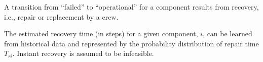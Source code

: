 \documentclass[runningheads]{llncs}
\begin{document}
A transition from  ``failed'' to  ``operational'' for a component results from recovery, i.e., repair or replacement  by a crew. 


The estimated recovery time (in steps) for a given component, $i$, can be learned from historical data and represented by the probability distribution of repair time $T_{ri}$. Instant recovery is assumed to be infeasible. 





\end{document}
